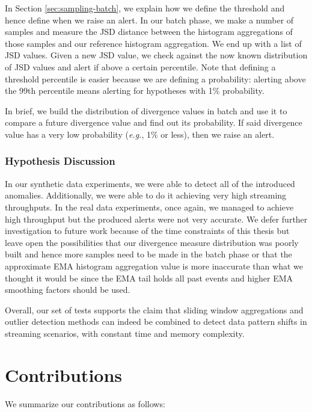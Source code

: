 In Section \ref{sec:sampling-batch}, we explain how we define the threshold and hence define when we raise an alert. In our batch phase, we make a number of samples and measure the JSD distance between the histogram aggregations of those samples and our reference histogram aggregation. We end up with a list of JSD values. Given a new JSD value, we check against the now known distribution of JSD values and alert if above a certain percentile. Note that defining a threshold percentile is easier because we are defining a probability: alerting above the 99th percentile means alerting for hypotheses with 1\% probability.

In brief, we build the distribution of divergence values in batch and use it to compare a future divergence value and find out its probability. If said divergence value has a very low probability (\textit{e.g.}, 1\% or less), then we raise an alert.

\subsubsection*{Hypothesis Discussion}
In our synthetic data experiments, we were able to detect all of the introduced anomalies. Additionally, we were able to do it achieving very high streaming throughputs. In the real data experiments, once again, we managed to achieve high throughput but the produced alerts were not very accurate. We defer further investigation to future work because of the time constraints of this thesis but leave open the possibilities that our divergence measure distribution was poorly built and hence more samples need to be made in the batch phase or that the approximate EMA histogram aggregation value is more inaccurate than what we thought it would be since the EMA tail holds all past events and higher EMA smoothing factors should be used.

Overall, our set of tests supports the claim that sliding window aggregations and outlier detection methods can indeed be combined to detect data pattern shifts in streaming scenarios, with constant time and memory complexity.

\section{Contributions}
We summarize our contributions as follows:

